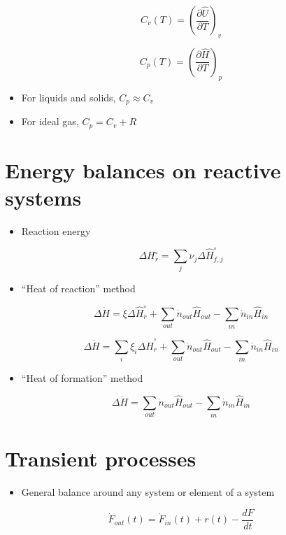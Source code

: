 \documentclass[11pt]{article}
\begin{document}
\[ C_{v}(T) = \left ( \frac{\partial\hat{U}}{\partial T} \right )_{v} \]

\[ C_{p}(T) = \left ( \frac{\partial\hat{H}}{\partial T} \right )_{p} \]

\begin{itemize}
\item For liquids and solids, \(C_{p} \approx C_{v}\)
\item For ideal gas, \(C_{p} = C_{v} + R\)
\end{itemize}

\section{Energy balances on reactive systems}
\label{sec-8}
\begin{itemize}
\item Reaction energy
\end{itemize}

\[ \Delta H^{\circ}_{r} = \sum_{j} \nu_{j} \Delta \hat{H}_{f,j}^{\circ} \]


\begin{itemize}
\item ``Heat of reaction'' method
\end{itemize}

\[ \Delta \dot{H} = \xi\Delta\hat{H}^{\circ}_{r} + \sum_{out}\dot{n}_{out}\hat{H}_{out}-\sum_{in}\dot{n}_{in}\hat{H}_{in} \]

\[ \Delta \dot{H} = \sum_{i}\xi_{i}\Delta\hat{H}^{\circ}_{r} + \sum_{out}\dot{n}_{out}\hat{H}_{out}-\sum_{in}\dot{n}_{in}\hat{H}_{in} \]

\begin{itemize}
\item ``Heat of formation'' method
\end{itemize}

\[ \Delta \dot{H} = \sum_{out}\dot{n}_{out}\hat{H}_{out}-\sum_{in}\dot{n}_{in}\hat{H}_{in} \]


\section{Transient processes}
\label{sec-9}
\begin{itemize}
\item General balance around any system or element of a system
\end{itemize}

\[ \dot{F}_{out}(t) = \dot{F}_{in}(t) + r(t) - \frac{dF}{dt} \]
\end{document}
